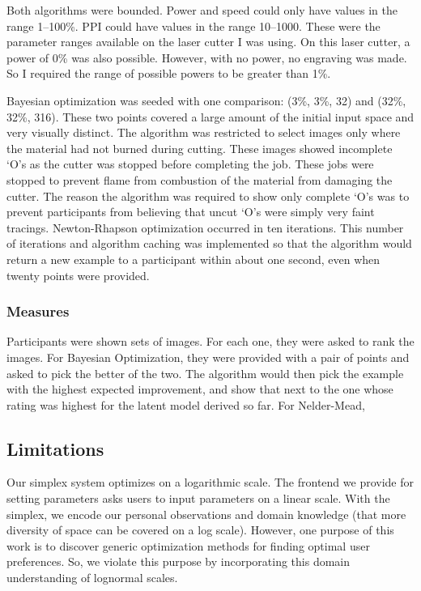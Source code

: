 Both algorithms were bounded.
Power and speed could only have values in the range 1--100\%.
PPI could have values in the range 10--1000.
These were the parameter ranges available on the laser cutter I was using.
On this laser cutter, a power of 0\% was also possible.
However, with no power, no engraving was made.
So I required the range of possible powers to be greater than 1\%.

Bayesian optimization was seeded with one comparison:
(3\%, 3\%, 32) and
(32\%, 32\%, 316).
These two points covered a large amount of the initial input space and very visually distinct.
The algorithm was restricted to select images only where the material had not burned during cutting.
These images showed incomplete `O's as the cutter was stopped before completing the job.
These jobs were stopped to prevent flame from combustion of the material from damaging the cutter.
The reason the algorithm was required to show only complete `O's was to prevent participants from believing that uncut `O's were simply very faint tracings.
Newton-Rhapson optimization occurred in ten iterations.
This number of iterations and algorithm caching was implemented so that the algorithm would return a new example to a participant within about one second, even when twenty points were provided.

\subsubsection{Measures}

Participants were shown sets of images.
For each one, they were asked to rank the images.
For Bayesian Optimization, they were provided with a pair of points and asked to pick the better of the two.
The algorithm would then pick the example with the highest expected improvement, and show that next to the one whose rating was highest for the latent model derived so far.
For Nelder-Mead, 


\subsection{Limitations}

Our simplex system optimizes on a logarithmic scale.
The frontend we provide for setting parameters asks users to input parameters on a linear scale.
With the simplex, we encode our personal observations and domain knowledge (that more diversity of space can be covered on a log scale).
However, one purpose of this work is to discover generic optimization methods for finding optimal user preferences.
So, we violate this purpose by incorporating this domain understanding of lognormal scales.

